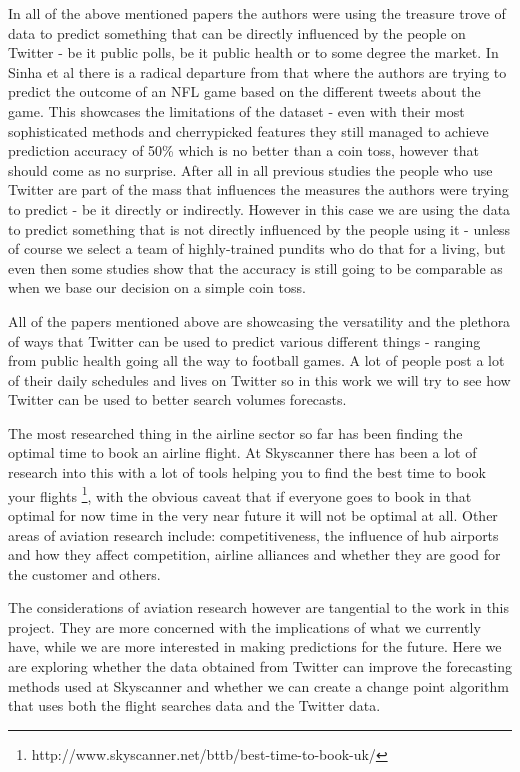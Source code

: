 \documentclass[minf,twoside,singlespacing,parskip,notimes,deptreport]{infthesis} %
\begin{document}
In all of the above mentioned papers the authors were using the treasure trove of data to predict something that can be directly influenced by the people on Twitter - be it public polls, be it public health or to some degree the market. In Sinha et al\cite{twitnfl} there is a radical departure from that where the authors are trying to predict the outcome of an NFL game based on the different tweets about the game. This showcases the limitations of the dataset - even with their most sophisticated methods and cherrypicked features they still managed to achieve prediction accuracy of 50\% which is no better than a coin toss, however that should come as no surprise. After all in all previous studies the people who use Twitter are part of the mass that influences the measures the authors were trying to predict - be it directly or indirectly. However in this case we are using the data to predict something that is not directly influenced by the people using it - unless of course we select a team of highly-trained pundits who do that for a living, but even then some studies show that the accuracy is still going to be comparable as when we base our decision on a simple coin toss.  

All of the papers mentioned above are showcasing the versatility and the plethora of ways that Twitter can be used to predict various different things - ranging from public health going all the way to football games. 
A lot of people post a lot of their daily schedules and lives on Twitter so in this work we will try to see how Twitter can be used to better search volumes forecasts. 


The most researched thing in the airline sector so far has been finding the optimal time to book an airline flight\cite{Hamletkdd03,ijcai}. 
At Skyscanner there has been a lot of research into this with a lot of tools helping you to find the best time to book your flights \footnote{http://www.skyscanner.net/bttb/best-time-to-book-uk/}, with the obvious caveat that if everyone goes to book in that optimal for now time in the very near future it will not be optimal at all. 
Other areas of aviation research include: competitiveness, the influence of hub airports and how they affect competition, airline alliances and whether they are good for the customer and others. 


The considerations of aviation research however are tangential to the work in this project. 
They are more concerned with the implications of what we currently have, while we are more interested in making predictions for the future. 
Here we are exploring whether the data obtained from Twitter can improve the forecasting methods used at Skyscanner and whether we can create a change point algorithm that uses both the flight searches data and the Twitter data. 
\end{document}
